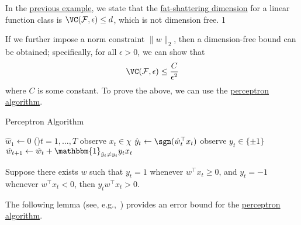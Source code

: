 \begin{prev}
	In the \hyperref[eg:lec16]{previous example}, we state that the \hyperref[def:fat-shattering-dimension]{fat-shattering dimension} for a linear function class is \(\VC(\mathcal{F}, \epsilon) \leq d\), which is not dimension free.	1
\end{prev}

If we further impose a norm constraint \(\lVert w \rVert _2\), then a dimension-free bound can be obtained; specifically, for all \(\epsilon > 0\), we can show that
\[
	\VC(\mathcal{F}, \epsilon) \leq \frac{C}{\epsilon^2}
\]
where \(C\) is some constant. To prove the above, we can use the \hyperref[algo:perceptron]{perceptron algorithm}.

\begin{algorithm}[H]\label{algo:perceptron}
	\DontPrintSemicolon
	\caption{Perceptron Algorithm}
	\BlankLine

	\(\hat{w} _1\gets 0\)\;
	\For(){\(t = 1, \dots  , T\)}{
	observe \(x_t \in \chi \)
	\(\hat{y} _t \gets \sgn(\hat{w} _t ^{\top} x_t)\)
	observe \(y_t \in \{ \pm 1 \} \)
	\(\hat{w} _{t+1} \gets \hat{w} _t + \mathbbm{1}_{\hat{y} _t \neq y_t} y_t x_t\)\;
	}
	\;
\end{algorithm}

\begin{remark}
	Suppose there exists \(w\) such that \(y_t = 1\) whenever \(w^{\top} x_t \geq 0\), and \(y_t = -1\) whenever \(w^{\top} x_t < 0\), then \(y_t w^{\top} x_t > 0\).
\end{remark}

The following lemma (see, e.g.,~\cite{novikoff1962convergence}) provides an error bound for the \hyperref[algo:perceptron]{perceptron algorithm}.

